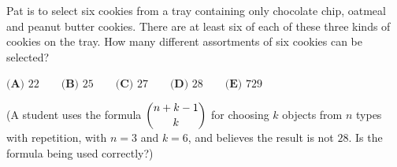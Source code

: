 Pat is to select six cookies from a tray containing only chocolate chip, oatmeal and peanut butter cookies. There are at least six of each of these three kinds of cookies on the tray. How many different assortments of six cookies can be selected?

$\textbf{(A) }22\qquad\textbf{(B) }25\qquad\textbf{(C) }27\qquad\textbf{(D) }28\qquad\textbf{(E) }729$

(A student uses the formula $\dbinom{n+k-1}{k}$ for choosing $k$ objects from $n$ types with repetition, with $n=3$ and $k=6$, and believes the result is not $28$. Is the formula being used correctly?)

